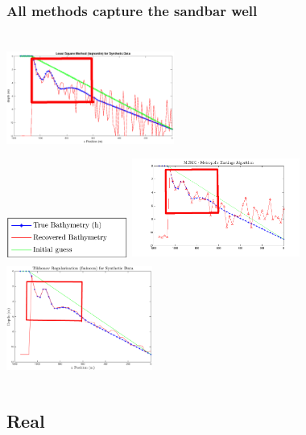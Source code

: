 \documentclass[7pt]{beamer}
\begin{document}
\begin{frame}
	\frametitle{All methods capture the sandbar well}
	   \begin{columns}[t]
        \centering
        \includegraphics[width=5.5cm,height=3.5cm]{img/lsqnonlin_simulated_10m_new_box.eps}\\
        \includegraphics[width=4.0cm,height=1.5cm]{img/legend_simulated.png}
        \centering
       \includegraphics[width=5.5cm,height=3.5cm]{img/MCMC-manufactured_new_box.png}\\
       \includegraphics[width=4.8cm,height=3.5cm]{img/fmincon_simulated_25m_new_box.png}
      \end{columns}
\end{frame}

\subsection{Real}
\end{document}
